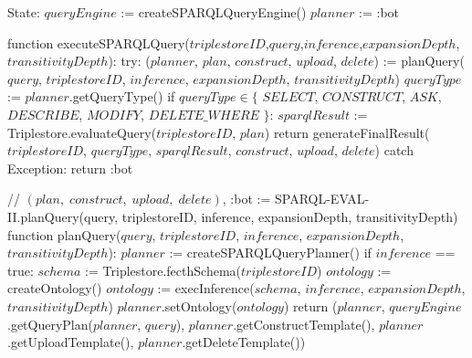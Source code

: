 State:
    $queryEngine$ := createSPARQLQueryEngine()
    $planner$ := :bot

function executeSPARQLQuery($triplestoreID$,$query$,$inference$,$expansionDepth$,$transitivityDepth$):
    try:
        ($planner$, $plan$, $construct$, $upload$, $delete$) := planQuery($query$, $triplestoreID$, $inference$, $expansionDepth$, $transitivityDepth$) 
        $queryType$ := $planner$.getQueryType()
        if $queryType \in \{$ $SELECT$, $CONSTRUCT$, $ASK$, $DESCRIBE$, $MODIFY$, $DELETE\_WHERE$ $\}$:
            $sparqlResult$ := Triplestore.evaluateQuery($triplestoreID$, $plan$)
        return generateFinalResult($triplestoreID$, $queryType$, $sparqlResult$, $construct$, $upload$, $delete$)
    catch Exception:
        return :bot

// {$(plan, \; construct, \; upload, \; delete)$, :bot} := \textrm{SPARQL-EVAL-II}.planQuery(query, triplestoreID, inference, expansionDepth, transitivityDepth)
function planQuery($query$, $triplestoreID$, $inference$, $expansionDepth$, $transitivityDepth$):
    $planner$ := createSPARQLQueryPlanner()
    if $inference$ == true:
        $schema$ := Triplestore.fecthSchema($triplestoreID$)
        $ontology$ := createOntology()
        $ontology$ := execInference($schema$, $inference$, $expansionDepth$, $transitivityDepth$)
        $planner$.setOntology($ontology$)   
    return ($planner$, $queryEngine$.getQueryPlan($planner$, $query$), $planner$.getConstructTemplate(), $planner$.getUploadTemplate(), $planner$.getDeleteTemplate())
